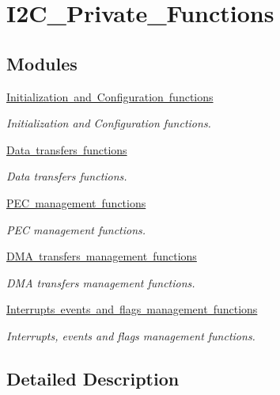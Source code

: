 \hypertarget{group___i2_c___private___functions}{}\section{I2\+C\+\_\+\+Private\+\_\+\+Functions}
\label{group___i2_c___private___functions}
\subsection*{Modules}
\begin{DoxyCompactItemize}
\item 
\mbox{\hyperlink{group___i2_c___group1}{Initialization and Configuration functions}}
\begin{DoxyCompactList}\small\item\em Initialization and Configuration functions. \end{DoxyCompactList}\item 
\mbox{\hyperlink{group___i2_c___group2}{Data transfers functions}}
\begin{DoxyCompactList}\small\item\em Data transfers functions. \end{DoxyCompactList}\item 
\mbox{\hyperlink{group___i2_c___group3}{P\+E\+C management functions}}
\begin{DoxyCompactList}\small\item\em P\+EC management functions. \end{DoxyCompactList}\item 
\mbox{\hyperlink{group___i2_c___group4}{D\+M\+A transfers management functions}}
\begin{DoxyCompactList}\small\item\em D\+MA transfers management functions. \end{DoxyCompactList}\item 
\mbox{\hyperlink{group___i2_c___group5}{Interrupts events and flags management functions}}
\begin{DoxyCompactList}\small\item\em Interrupts, events and flags management functions. \end{DoxyCompactList}\end{DoxyCompactItemize}


\subsection{Detailed Description}
